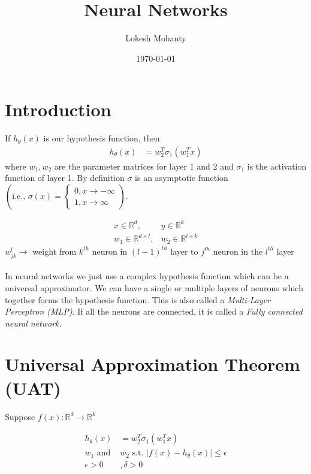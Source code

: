\documentclass[11pt]{article}
\author{Lokesh Mohanty}
\date{\today}
\title{Neural Networks}
\begin{document}
\maketitle
\tableofcontents

\section{Introduction}
\label{sec:neural-networks}

If $h_{\theta}(x)$ is our hypothesis function, then
\begin{align*}
h_{\theta}(x) &= w_2^T\sigma_1 \left( w_1^T x \right)
\end{align*}
where $w_1, w_2$ are the parameter matrices for layer 1 and 2 and $\sigma_1$ is the activation function of layer 1. By definition $\sigma$ is an asymptotic function $\left(\text{i.e., }\sigma(x) = \begin{cases} 0, x \rightarrow -\infty  \\ 1, x \rightarrow \infty \end{cases} \right)$.

\begin{align*}
  x \in \mathbb{R}^d,& y \in \mathbb{R}^k \\
  w_1 \in \mathbb{R}^{d \times l},& w_2 \in \mathbb{R}^{l \times k}
\end{align*}
  $w^l_{jk} \rightarrow$ weight from $k^{th}$ neuron in $(l-1)^{th}$ layer to $j^{th}$ neuron in the $l^{th}$ layer \\

\paragraph{} In neural networks we just use a complex hypothesis function which can be a universal approximator. We can have a single or multiple layers of neurons which together forms the hypothesis function. This is also called a \textit{Multi-Layer Perceptron (MLP)}. If all the neurons are connected, it is called a \textit{Fully connected neural network}.

\section{Universal Approximation Theorem (UAT)}
Suppose $f(x): \mathbb{R}^d \rightarrow \mathbb{R}^k$

\begin{align*}
  h_{\theta}(x) &= w_2^T \sigma_1(w_1^Tx) \\
  w_1 \text{ and } &w_2 \text{ s.t. } |f(x) - h_{\theta}(x)| \leq \epsilon\\
  \epsilon > 0 &, \delta > 0
\end{align*}
\end{document}
